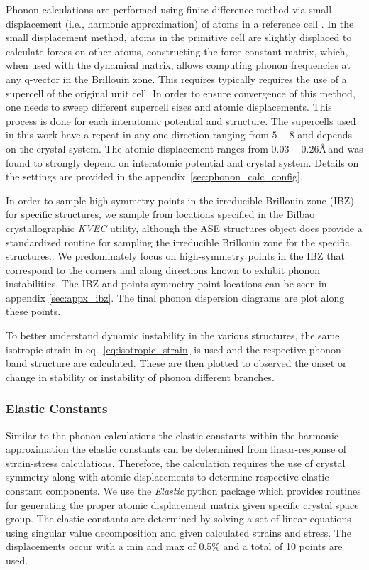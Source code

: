 \documentclass[preprint,colorlinks=true,linkcolor=black,citecolor=black]{elsarticle}
\begin{document}
Phonon calculations are performed using finite-difference method via
small displacement (i.e., harmonic approximation) of atoms in a
reference cell \cite{Alfe2009}. In the small displacement method,
atoms in the primitive cell are slightly displaced to calculate forces
on other atoms, constructing the force constant matrix, which, when
used with the dynamical matrix, allows computing phonon frequencies at
any q-vector in the Brillouin zone. This requires typically requires
the use of a supercell of the original unit cell. In order to ensure
convergence of this method, one needs to sweep different supercell
sizes and atomic displacements. This process is done for each
interatomic potential and structure. The supercells used in this work
have a repeat in any one direction ranging from $5-8$ and depends on
the crystal system. The atomic displacement ranges from
$0.03-0.26$\AA\,and was found to strongly depend on interatomic
potential and crystal system. Details on the settings are provided in
the appendix~\ref{sec:phonon_calc_config}. \par

In order to sample high-symmetry points in the irreducible Brillouin
zone (IBZ) for specific structures, we sample from locations specified
in the Bilbao crystallographic \textit{KVEC} utility\cite{Aroyo2014},
although the ASE structures object does provide a standardized routine
for sampling the irreducible Brillouin zone for the specific
structures.\cite{Setyawan2010}. We predominately focus on
high-symmetry points in the IBZ that correspond to the corners and
along directions known to exhibit phonon instabilities. The IBZ and
points symmetry point locations can be seen in appendix
\ref{sec:appx_ibz}. The final phonon dispersion diagrams are plot
along these points. \par

To better understand dynamic instability in the various structures,
the same isotropic strain in eq.~\ref{eq:isotropic_strain} is used and
the respective phonon band structure are calculated. These are then
plotted to observed the onset or change in stability or instability of
phonon different branches. \par

\subsubsection{Elastic Constants}

Similar to the phonon calculations the elastic constants within the
harmonic approximation the elastic constants can be determined from
linear-response of strain-stress calculations. Therefore, the
calculation requires the use of crystal symmetry along with atomic
displacements to determine respective elastic constant components. We
use the \textit{Elastic}\cite{Jochym2018} python package which
provides routines for generating the proper atomic displacement matrix
given specific crystal space group. The elastic constants are
determined by solving a set of linear equations using singular value
decomposition and given calculated strains and stress. The
displacements occur with a min and max of 0.5\% and a total of 10
points are used. \par
\end{document}
